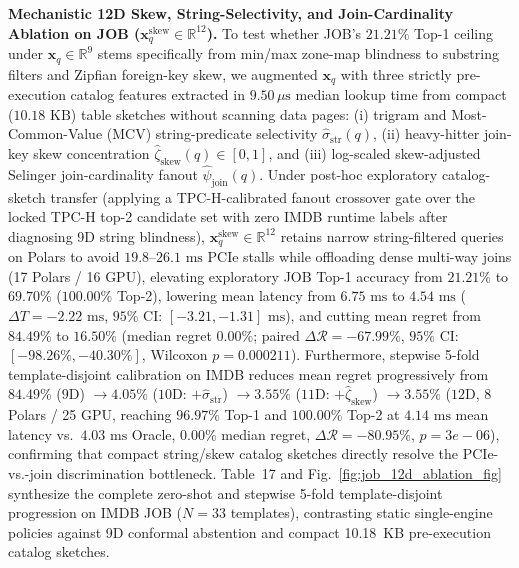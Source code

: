 \documentclass[10pt,a4paper]{article}
\begin{document}
\begin{enumerate}[leftmargin=1.5em,itemsep=2pt]
\textbf{Mechanistic 12D Skew, String-Selectivity, and Join-Cardinality Ablation on JOB ($\mathbf{x}_q^{\text{skew}} \in \mathbb{R}^{12}$).} To test whether JOB's $21.21\%$ Top-1 ceiling under $\mathbf{x}_q \in \mathbb{R}^{9}$ stems specifically from min/max zone-map blindness to substring filters and Zipfian foreign-key skew, we augmented $\mathbf{x}_q$ with three strictly pre-execution catalog features extracted in $9.50\,\mu\text{s}$ median lookup time from compact ($10.18\text{ KB}$) table sketches without scanning data pages: (i) trigram and Most-Common-Value (MCV) string-predicate selectivity $\hat{\sigma}_{\text{str}}(q)$, (ii) heavy-hitter join-key skew concentration $\hat{\zeta}_{\text{skew}}(q) \in [0,1]$, and (iii) log-scaled skew-adjusted Selinger join-cardinality fanout $\hat{\psi}_{\text{join}}(q)$. Under post-hoc exploratory catalog-sketch transfer (applying a TPC-H-calibrated fanout crossover gate over the locked TPC-H top-2 candidate set with zero IMDB runtime labels after diagnosing 9D string blindness), $\mathbf{x}_q^{\text{skew}} \in \mathbb{R}^{12}$ retains narrow string-filtered queries on Polars to avoid $19.8\text{--}26.1\text{ ms}$ PCIe stalls while offloading dense multi-way joins (17 Polars / 16 GPU), elevating exploratory JOB Top-1 accuracy from $21.21\%$ to $69.70\%$ ($100.00\%$ Top-2), lowering mean latency from $6.75\text{ ms}$ to $4.54\text{ ms}$ ($\Delta T = -2.22\text{ ms}$, $95\%$ CI: $[-3.21, -1.31]\text{ ms}$), and cutting mean regret from $84.49\%$ to $16.50\%$ (median regret $0.00\%$; paired $\Delta\mathcal{R} = -67.99\%$, $95\%$ CI: $[-98.26\%, -40.30\%]$, Wilcoxon $p = 0.000211$). Furthermore, stepwise 5-fold template-disjoint calibration on IMDB reduces mean regret progressively from $84.49\%$ ($9\text{D}$) $\rightarrow 4.05\%$ ($10\text{D}$: $+\hat{\sigma}_{\text{str}}$) $\rightarrow 3.55\%$ ($11\text{D}$: $+\hat{\zeta}_{\text{skew}}$) $\rightarrow 3.55\%$ ($12\text{D}$, 8 Polars / 25 GPU, reaching $96.97\%$ Top-1 and $100.00\%$ Top-2 at $4.14\text{ ms}$ mean latency vs.\ $4.03\text{ ms}$ Oracle, $0.00\%$ median regret, $\Delta\mathcal{R} = -80.95\%$, $p = 3e-06$), confirming that compact string/skew catalog sketches directly resolve the PCIe-vs.-join discrimination bottleneck. Table~17 and Fig.~\ref{fig:job_12d_ablation_fig} synthesize the complete zero-shot and stepwise 5-fold template-disjoint progression on IMDB JOB ($N=33$ templates), contrasting static single-engine policies against 9D conformal abstention and compact 10.18~KB pre-execution catalog sketches.


\end{enumerate}
\end{document}

